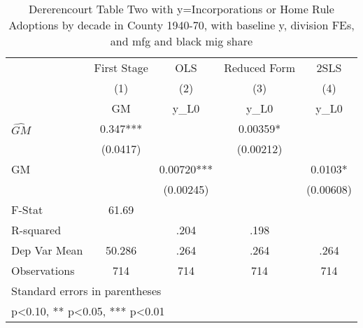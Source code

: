 \begin{table}[htbp]\centering
\def\sym#1{\ifmmode^{#1}\else\(^{#1}\)\fi}
\caption{Dererencourt Table Two with y=Incorporations or Home Rule Adoptions by decade in County 1940-70, with baseline y, division FEs, and mfg and black mig share}
\begin{tabular}{l*{4}{c}}
\toprule
                    & First Stage   &         OLS   &Reduced Form   &        2SLS   \\
                    &\multicolumn{1}{c}{(1)}&\multicolumn{1}{c}{(2)}&\multicolumn{1}{c}{(3)}&\multicolumn{1}{c}{(4)}\\
                    &\multicolumn{1}{c}{GM}&\multicolumn{1}{c}{y\_L0}&\multicolumn{1}{c}{y\_L0}&\multicolumn{1}{c}{y\_L0}\\
\midrule
$\hat{GM}$          &       0.347***&               &     0.00359*  &               \\
                    &    (0.0417)   &               &   (0.00212)   &               \\
\addlinespace
GM                  &               &     0.00720***&               &      0.0103*  \\
                    &               &   (0.00245)   &               &   (0.00608)   \\
\midrule
F-Stat              &       61.69   &               &               &               \\
R-squared           &               &        .204   &        .198   &               \\
Dep Var Mean        &      50.286   &        .264   &        .264   &        .264   \\
Observations        &         714   &         714   &         714   &         714   \\
\bottomrule
\multicolumn{5}{l}{\footnotesize Standard errors in parentheses}\\
\multicolumn{5}{l}{\footnotesize * p<0.10, ** p<0.05, *** p<0.01}\\
\end{tabular}
\end{table}
